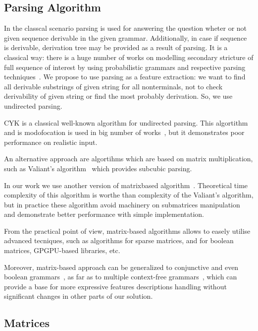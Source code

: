 \documentclass[a4paper,twoside]{article}
\begin{document}
\subsection{Parsing Algorithm}

\noindent In the classcal scenario parsing is used for answering the question wheter or not given sequence derivable in the given grammar.
Additionally, in case if sequence is derivable, derivation tree may be provided as a result of parsing. 
It is a classical way: there is a huge number of works on modelling secondary stricture of full sequence of interest by using probabilistic grammars and respective parsing techniques~\cite{!!!}.
We propose to use parsing as a feature extraction: we want to find all derivable substrings of given string for all nonterminals, not to check derivability of given string or find the most probably derivation.
So, we use undirected parsing.

CYK is a classical well-known algorithm for undirected parsing. 
This algortithm and is modofocation is used in big number of works~\cite{!!!}, but it demonstrates poor performance on realistic input.

An alternative approach are algortihms which are based on matrix multiplication, such as Valiant's algorithm~\cite{Valiant:1975:GCR:1739932.1740048} which provides subcubic parsing.

In our work we use another version of matrixbased algorithm~\cite{Azimov:2018:CPQ:3210259.3210264}.
Theoretical time complexity of this algorithm is worthe than complexity of the Valiant's algorithm, but in practice these algorithm avoid machinery on submatrices manipulation and demonstrate better performance with simple implementation.

From the practical point of view, matrix-based algorithms allows to easely utilise advanced tecniques, such as algorithms for sparse matrices, and for boolean matrices, GPGPU-based libraries, etc.

Moreover, matrix-based approach can be generalized to conjunctive and even boolean grammars~\cite{OKHOTIN2014101}, as far as to multiple context-free grammars~\cite{mcfgMatrices}, which can provide a base for more expressive features descriptions handling without significant changes in other parts of our solution.

\subsection{Matrices}
\end{document}

